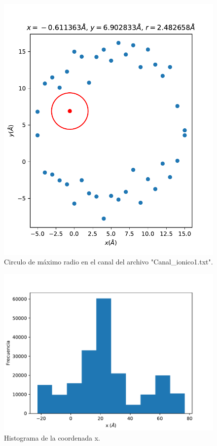 \documentclass[12pt,letterpaper]{article}
\begin{document}
\begin{figure}[H]
\includegraphics{canal1.pdf}
\caption{Circulo de máximo radio en el canal del archivo "Canal\_ionico1.txt".}
\centering
\end{figure}

\begin{figure}[H]
\includegraphics{x1_hist.pdf}
\caption{Histograma de la coordenada x.}
\centering
\end{figure}
\end{document}
